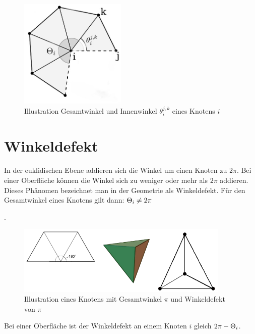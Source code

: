 \begin{figure}[H]%
    \centering
  \includegraphics[width=2in]{images/gesammtwinkel.jpg}
  \caption{Illustration Gesamtwinkel \gesamtwinkel und Innenwinkel  $\theta_i^{j,k}$  eines Knotens $i$  \cite{Sharp:2019:NIT}}
\end{figure}
 
\section*{Winkeldefekt}
\label{def:winkeldefekt}
In der euklidischen Ebene addieren sich die Winkel um einen Knoten zu $2\pi$. Bei einer Oberfläche können die Winkel sich zu weniger oder mehr als $2\pi$ addieren.\\
Dieses Phänomen bezeichnet man in der Geometrie als Winkeldefekt. Für den Gesamtwinkel eines Knotens gilt dann: $\gesamtwinkel* \neq 2\pi$ 

\cite{richeson:2012:euler}.\\
\begin{figure}[H]%
    \centering
  \includegraphics[width=4in]{images/winkeldefekt_polyder_2.png}
  \caption{Illustration eines Knotens mit Gesamtwinkel $\pi$ und  Winkeldefekt von $\pi$ \cite{Koch_2019_CVPR}}
\end{figure}
 
 Bei einer Oberfläche ist der Winkeldefekt an einem Knoten $i$ gleich $2\pi - \gesamtwinkel* $. 

